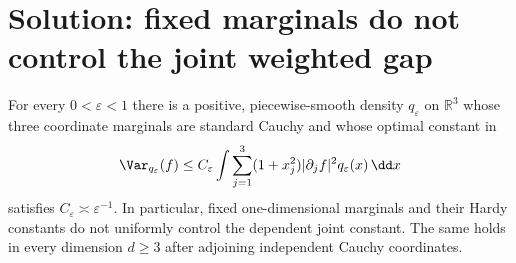 \documentclass[../main.tex]{subfiles}
\begin{document}

\section*{Solution: fixed marginals do not control the joint weighted gap}
\label{sec:sol-obs-marginals-not-joint}

\begin{proposition}
\label{prop:sol-a3-marginals-not-joint}
For every $0<\varepsilon<1$ there is a positive, piecewise-smooth density $q_\varepsilon$ on
$\mathbb R^3$ whose three coordinate marginals are standard Cauchy and whose optimal constant in
\[
 \Var_{q_\varepsilon}(f)
 \le C_\varepsilon
 \int\sum_{j=1}^3(1+x_j^2)|\partial_jf|^2q_\varepsilon(x)\,\dd x
\]
satisfies $C_\varepsilon\asymp\varepsilon^{-1}$. In particular, fixed one-dimensional marginals
and their Hardy constants do not uniformly control the dependent joint constant. The same holds
in every dimension $d\ge3$ after adjoining independent Cauchy coordinates.
\end{proposition}
\end{document}
